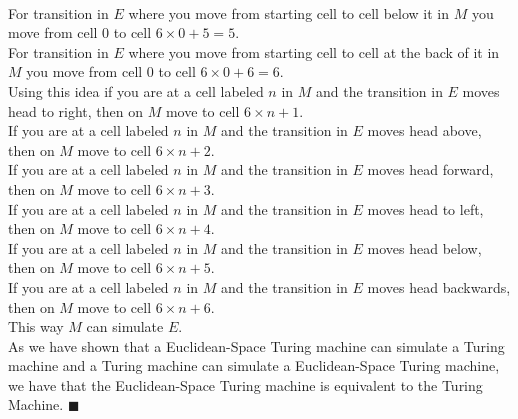 \documentclass[addpoints]{exam}
\begin{document}
\begin{questions}
\begin{solution}
    \\For transition in $E$ where you move from starting cell to cell below it in $M$ you move from cell 0 to cell $6\times 0 + 5 = 5$.
    \\For transition in $E$ where you move from starting cell to cell at the back of it in $M$ you move from cell 0 to cell $6\times 0 + 6 = 6$.
    \\Using this idea if you are at a cell labeled $n$ in $M$ and the transition in $E$ moves head to right, then on $M$ move to cell $6\times n + 1$.
    \\If you are at a cell labeled $n$ in $M$ and the transition in $E$ moves head above, then on $M$ move to cell $6\times n + 2$.
    \\If you are at a cell labeled $n$ in $M$ and the transition in $E$ moves head forward, then on $M$ move to cell $6\times n + 3$.
    \\If you are at a cell labeled $n$ in $M$ and the transition in $E$ moves head to left, then on $M$ move to cell $6\times n + 4$.
    \\If you are at a cell labeled $n$ in $M$ and the transition in $E$ moves head below, then on $M$ move to cell $6\times n + 5$.
    \\If you are at a cell labeled $n$ in $M$ and the transition in $E$ moves head backwards, then on $M$ move to cell $6\times n + 6$.
    \\This way $M$ can simulate $E$.
    \\As we have shown that a Euclidean-Space Turing machine can simulate a Turing machine and a Turing machine can simulate a Euclidean-Space Turing machine, we have that the Euclidean-Space Turing machine is equivalent to the Turing Machine.
    \hfill\(\blacksquare\)
	
  \end{solution}


\end{questions}
\end{document}
